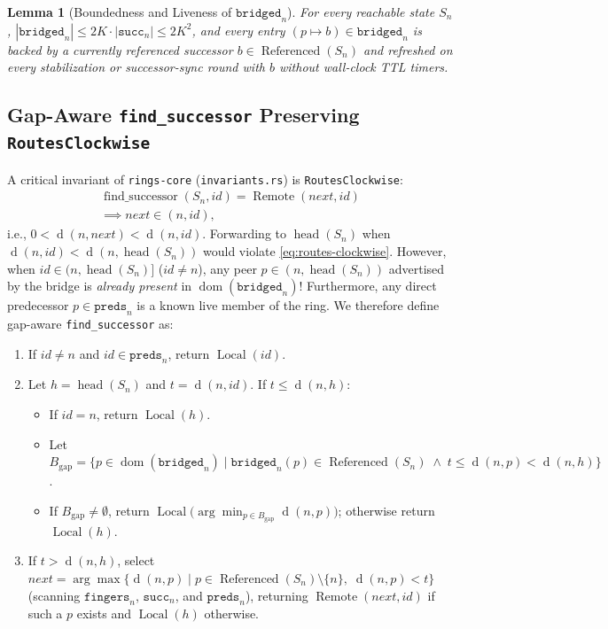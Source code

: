 \documentclass[journal]{IEEEtran}
\newtheorem{lemma}{Lemma}
\newcommand{\dist}{\operatorname{d}}
\newcommand{\Head}{\operatorname{head}}
\newcommand{\Referenced}{\operatorname{Referenced}}
\begin{document}
\begin{lemma}[Boundedness and Liveness of $\texttt{bridged}_n$]
For every reachable state $S_n$, $|\texttt{bridged}_n| \le 2K \cdot |\texttt{succ}_n|
\le 2K^2$, and every entry $(p \mapsto b) \in \texttt{bridged}_n$ is backed by a
currently referenced successor $b \in \Referenced(S_n)$ and refreshed on every
stabilization or successor-sync round with $b$ without wall-clock TTL timers.
\end{lemma}

\subsection{Gap-Aware \texttt{find\_successor} Preserving \texttt{RoutesClockwise}}
A critical invariant of \texttt{rings-core} (\texttt{invariants.rs}) is
\texttt{RoutesClockwise}:
\begin{multline}
  \operatorname{find\_successor}(S_n, \mathit{id}) =
  \operatorname{Remote}(\mathit{next}, \mathit{id}) \\
  \implies \mathit{next} \in (n, \mathit{id}),
  \label{eq:routes-clockwise}
\end{multline}
i.e., $0 < \dist(n, \mathit{next}) < \dist(n, \mathit{id})$. Forwarding to
$\Head(S_n)$ when $\dist(n, \mathit{id}) < \dist(n, \Head(S_n))$ would violate
\eqref{eq:routes-clockwise}. However, when $\mathit{id} \in (n, \Head(S_n)]$
($\mathit{id} \neq n$), any peer $p \in (n, \Head(S_n))$ advertised by the
bridge is \emph{already present} in $\operatorname{dom}(\texttt{bridged}_n)$!
Furthermore, any direct predecessor $p \in \texttt{preds}_n$ is a known live
member of the ring. We therefore define gap-aware \texttt{find\_successor} as:
\begin{enumerate}
  \item If $\mathit{id} \neq n$ and $\mathit{id} \in \texttt{preds}_n$, return
  $\operatorname{Local}(\mathit{id})$.
  \item Let $h = \Head(S_n)$ and $t = \dist(n, \mathit{id})$. If $t \le \dist(n, h)$:
  \begin{itemize}
    \item If $\mathit{id} = n$, return $\operatorname{Local}(h)$.
    \item Let $B_{\text{gap}} = \{p \in \operatorname{dom}(\texttt{bridged}_n) \mid
    \texttt{bridged}_n(p) \in \Referenced(S_n) \;\land\;
    t \le \dist(n, p) < \dist(n, h)\}$.
    \item If $B_{\text{gap}} \neq \emptyset$, return
    $\operatorname{Local}\bigl(\arg\min_{p \in B_{\text{gap}}} \dist(n, p)\bigr)$;
    otherwise return $\operatorname{Local}(h)$.
  \end{itemize}
  \item If $t > \dist(n, h)$, select $\mathit{next} = \arg\max\{\dist(n, p) \mid
  p \in \Referenced(S_n) \setminus \{n\},\; \dist(n, p) < t\}$ (scanning
  $\texttt{fingers}_n$, $\texttt{succ}_n$, and $\texttt{preds}_n$), returning
  $\operatorname{Remote}(\mathit{next}, \mathit{id})$ if such a $p$ exists and
  $\operatorname{Local}(h)$ otherwise.
\end{enumerate}
\end{document}
